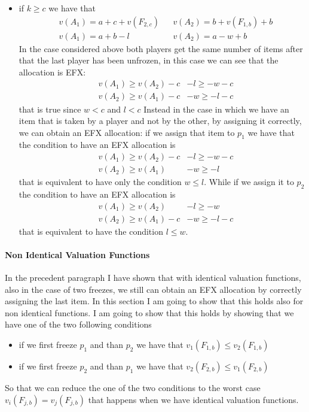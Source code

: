 \documentclass{article}
\begin{document}
\begin{itemize}
    \item if $k \ge c$ we have that
    \begin{align*}
        &v(A_1) = a + c + v(F_{2,c}) && v(A_2) = b + v(F_{1,b}) + b\\
        &v(A_1) = a + b-l && v(A_2) = a - w + b
    \end{align*}
    In the case considered above both players get the same number of items after that the last player has been unfrozen, in this case we can see that the allocation is EFX: 
    \begin{align*}
        &v(A_1) \ge v(A_2) -c & -l \ge - w - c\\
        &v(A_2) \ge v(A_1) -c & -w \ge -l -c
    \end{align*}
    that is true since $w<c$ and $l<c$
    Instead in the case in which we have an item that is taken by a player and not by the other, by assigning it correctly, we can obtain an EFX allocation: if we assign that item to $p_1$ we have that the condition to have an EFX allocation is
    \begin{align*}
        &v(A_1) \ge v(A_2) -c & -l \ge - w - c\\
        &v(A_2) \ge v(A_1) & -w \ge -l 
    \end{align*}
    that is equivalent to have only the condition $w\le l$.
    While if we assign it to $p_2$ the condition to have an EFX allocation is
    \begin{align*}
        &v(A_1) \ge v(A_2) & -l \ge - w\\
        &v(A_2) \ge v(A_1)-c & -w \ge -l -c
    \end{align*}
    that is equivalent to have the condition $l\le w$.
\end{itemize}
\paragraph{Non Identical Valuation Functions} 
In the precedent paragraph I have shown that with identical valuation functions, also in the case of two freezes, we still can obtain an EFX allocation by correctly assigning the last item. In this section I am going to show that this holds also for non identical functions. I am going to show that this holds by showing that we have one of the two following conditions

\begin{itemize}
    \item if we first freeze $p_1$ and than $p_2$ we have that $v_1(F_{1,b})\le v_2(F_{1,b})$
    \item if we first freeze $p_2$ and than $p_1$ we have that $v_2(F_{2,b})\le v_1(F_{2,b})$
\end{itemize}
So that we can reduce the one of the two conditions to the worst case $v_i(F_{j,b}) = v_j(F_{j,b})$ that happens when we have identical valuation functions.\\
\end{document}
